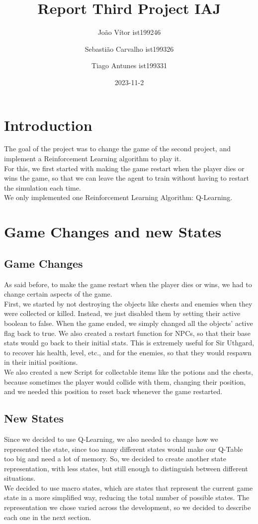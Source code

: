 \documentclass{article}
\title{Report Third Project IAJ}
\author{João Vítor ist199246
  \and Sebastião Carvalho ist199326
  \and Tiago Antunes ist199331}
\date{2023-11-2}
\begin{document}
  \maketitle
  \tableofcontents
  \newpage
  \section{Introduction}
  The goal of the project was to change the game of the second project, and implement a Reinforcement Learning algorithm to play it.\\
  For this, we first started with making the game restart when the player dies or wins the game, so that we can leave the agent to train
  without having to restart the simulation each time.\\
  We only implemented one Reinforcement Learning Algorithm: Q-Learning.\\
  \section{Game Changes and new States}
  \subsection{Game Changes}
  As said before, to make the game restart when the player dies or wins, we had to change certain aspects of the game.\\
  First, we started by not destroying the objects like chests and enemies when they were collected or killed. Instead, we just disabled 
  them by setting their active boolean to false. When the game ended, we simply changed all the objects' active flag back to true.
  We also created a restart function for NPCs, so that their base stats would go back to their initial stats. This is extremely useful for Sir Uthgard,
  to recover his health, level, etc., and for the enemies, so that they would respawn in their initial positions.\\
  We also created a new Script for collectable items like the potions and the chests, because sometimes the player would collide with them, 
  changing their position, and we needed this position to reset back whenever the game restarted.
  \subsection{New States}
  Since we decided to use Q-Learning, we also needed to change how we represented the state, since too many different states would make our 
  Q-Table too big and need a lot of memory. So, we decided to create another state representation, with less states, but still enough to 
  distinguish between different situations.\\
  We decided to use macro states, which are states that represent the current game state in a more simplified way, reducing the total number of possible states.
  The representation we chose varied across the development, so we decided to describe each one in the next section.
\end{document}
